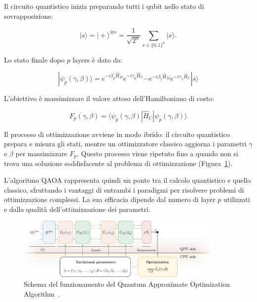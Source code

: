 Il circuito quantistico inizia preparando tutti i qubit nello stato di sovrapposizione:

\begin{equation}
   |s\rangle = |+\rangle^{\otimes n} = \frac{1}{\sqrt{2^n}}\sum_{x\in\{{0,1\}}^n} |x\rangle.
\end{equation}

Lo stato finale dopo $p$ layers è dato da:

\begin{equation}
   |\psi_p(\gamma, \beta)\rangle = e^{-i\beta_p \hat{H}_M} e^{-i\gamma_p \hat{H}_C} \cdots e^{-i\beta_1 \hat{H}_M} e^{-i\gamma_1 \hat{H}_C} |s\rangle
\end{equation}

L'obiettivo è massimizzare il valore atteso dell'Hamiltoniano di costo:

\begin{equation}
   F_p(\gamma, \beta) = \langle\psi_p(\gamma, \beta)| \hat{H}_C |\psi_p(\gamma, \beta)\rangle
\end{equation}

Il processo di ottimizzazione avviene in modo ibrido: il circuito quantistico prepara e 
misura gli stati, mentre un ottimizzatore classico aggiorna i parametri $\gamma$ e $\beta$ 
per massimizzare $F_p$. Questo processo viene ripetuto fino a quando non si trova una 
soluzione soddisfacente al problema di ottimizzazione (Figura~\ref{fig:figqaoa}).

L'algoritmo QAOA rappresenta quindi un ponte tra il calcolo quantistico e quello classico, 
sfruttando i vantaggi di entrambi i paradigmi per risolvere problemi di ottimizzazione 
complessi. La sua efficacia dipende dal numero di layer $p$ utilizzati e dalla qualità 
dell'ottimizzazione dei parametri.


\begin{figure}[h!]\label{fig:figqaoa}
    \centering
    \includegraphics[width=0.9\textwidth]{images/qaoa.jpg}
    \caption{Schema del funzionamento del Quantum Approximate Optimization Algorithm~\cite{blekos2024review}.}
\end{figure}